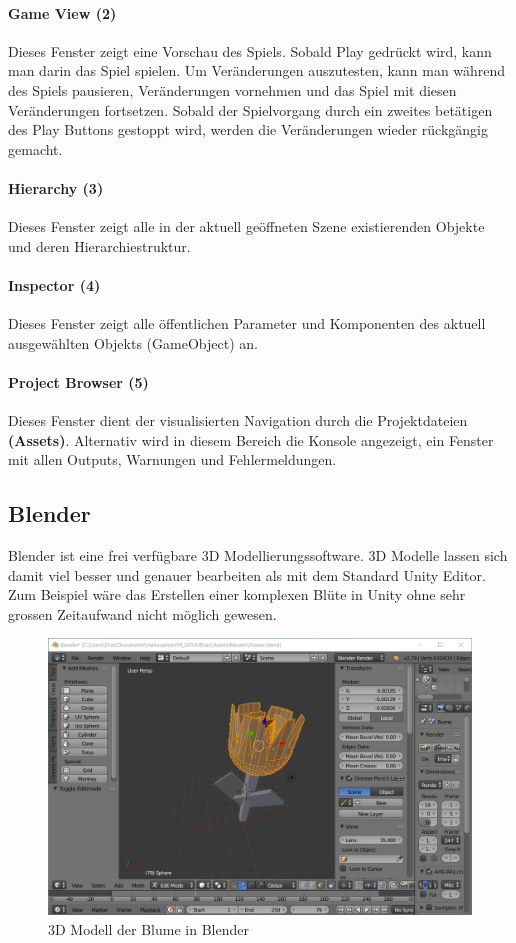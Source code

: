 \paragraph{Game View (2)}
Dieses Fenster zeigt eine Vorschau des Spiels.
Sobald Play gedrückt wird, kann man darin das Spiel spielen.
Um Veränderungen auszutesten, kann man während des Spiels pausieren, Veränderungen vornehmen und das Spiel mit diesen Veränderungen fortsetzen. Sobald der Spielvorgang durch ein zweites betätigen des Play Buttons gestoppt wird, werden die Veränderungen wieder rückgängig gemacht.

\paragraph{Hierarchy (3)}
Dieses Fenster zeigt alle in der aktuell geöffneten Szene existierenden Objekte und deren Hierarchiestruktur.

\paragraph{Inspector (4)}
Dieses Fenster zeigt alle öffentlichen Parameter und Komponenten des aktuell ausgewählten Objekts (GameObject) an.

\paragraph{Project Browser (5)}
Dieses Fenster dient der visualisierten Navigation durch die Projektdateien \textbf{(Assets)}.
Alternativ wird in diesem Bereich die Konsole angezeigt, ein Fenster mit allen Outputs, Warnungen und Fehlermeldungen.

\subsection{Blender}
Blender ist eine frei verfügbare 3D Modellierungssoftware.
3D Modelle lassen sich damit viel besser und genauer bearbeiten als mit dem Standard Unity Editor. 
Zum Beispiel wäre das Erstellen einer komplexen Blüte in Unity ohne sehr grossen Zeitaufwand nicht möglich gewesen.

\begin{figure}[H]
\includegraphics[scale=0.66]{screenshots/blenderflower.png}
\caption{3D Modell der Blume in Blender}
\end{figure}

